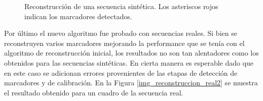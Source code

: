 \begin{figure}[!ht]
   \caption{Reconstrucción de una secuencia sintética. Los asteriscos rojos indican los marcadores detectados.} 
   \label{img_reconstruccion_sintetica}    
\end{figure} 

Por último el nuevo algoritmo fue probado con secuencias reales. Si bien se reconstruyen varios marcadores mejorando la performance que se tenía con el algoritmo de reconstrucción inicial, los resultados no son tan alentadores como los obtenidos para las secuencias sintéticas. En cierta manera es esperable dado que en este caso se adicionan errores provenientes de las etapas de detección de marcadores y de calibración. En la Figura \ref{img_reconstruccion_real2} se muestra el resultado obtenido para un cuadro de la secuencia real. 

\begin{figure}[H]
   \hspace{-1cm}
    \hspace{0.3cm}
    \hspace{2cm}

\end{figure}

